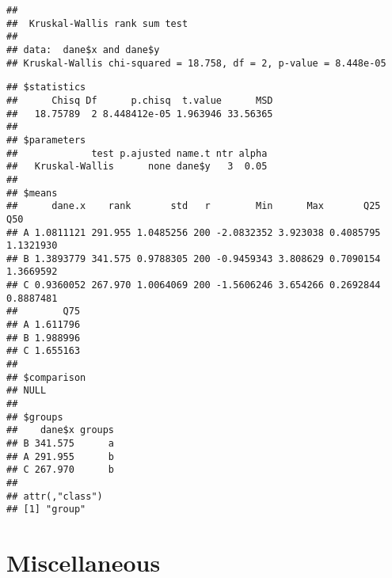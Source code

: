 \documentclass[
]{book}
\newenvironment{Shaded}{\begin{snugshade}}{\end{snugshade}}
\newcommand{\CommentTok}[1]{\textcolor[rgb]{0.56,0.35,0.01}{\textit{#1}}}
\newcommand{\FunctionTok}[1]{\textcolor[rgb]{0.00,0.00,0.00}{#1}}
\newcommand{\NormalTok}[1]{#1}
\newcommand{\OtherTok}[1]{\textcolor[rgb]{0.56,0.35,0.01}{#1}}
\newcommand{\SpecialCharTok}[1]{\textcolor[rgb]{0.00,0.00,0.00}{#1}}
\begin{document}
\begin{Shaded}
\end{Shaded}

\begin{verbatim}
## 
##  Kruskal-Wallis rank sum test
## 
## data:  dane$x and dane$y
## Kruskal-Wallis chi-squared = 18.758, df = 2, p-value = 8.448e-05
\end{verbatim}

\begin{Shaded}
\end{Shaded}

\begin{verbatim}
## $statistics
##      Chisq Df      p.chisq  t.value      MSD
##   18.75789  2 8.448412e-05 1.963946 33.56365
## 
## $parameters
##             test p.ajusted name.t ntr alpha
##   Kruskal-Wallis      none dane$y   3  0.05
## 
## $means
##      dane.x    rank       std   r        Min      Max       Q25       Q50
## A 1.0811121 291.955 1.0485256 200 -2.0832352 3.923038 0.4085795 1.1321930
## B 1.3893779 341.575 0.9788305 200 -0.9459343 3.808629 0.7090154 1.3669592
## C 0.9360052 267.970 1.0064069 200 -1.5606246 3.654266 0.2692844 0.8887481
##        Q75
## A 1.611796
## B 1.988996
## C 1.655163
## 
## $comparison
## NULL
## 
## $groups
##    dane$x groups
## B 341.575      a
## A 291.955      b
## C 267.970      b
## 
## attr(,"class")
## [1] "group"
\end{verbatim}

\hypertarget{miscellaneous}{%
\chapter{Miscellaneous}\label{miscellaneous}}
\end{document}
